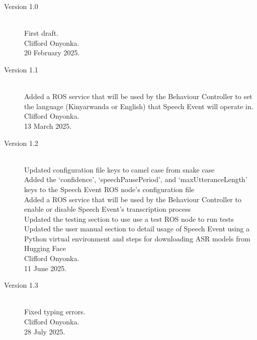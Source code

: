 \documentclass{CSSRforAfrica}
\begin{document}
\begin{description}

\item [Version 1.0]~\\
First draft. \\
Clifford Onyonka. \\                                     %
20 February 2025.                                                        %

\item [Version 1.1]~\\
Added a ROS service that will be used by the Behaviour Controller to set the language (Kinyarwanda or English) that Speech Event will operate in. \\
Clifford Onyonka. \\
13 March 2025.

\item [Version 1.2]~\\
Updated configuration file keys to camel case from snake case \\
Added the `confidence', `speechPausePeriod', and `maxUtteranceLength' keys to the Speech Event ROS node's configuration file \\
Added a ROS service that will be used by the Behaviour Controller to enable or disable Speech Event's transcription process \\
Updated the testing section to use use a test ROS node to run tests \\
Updated the user manual section to detail usage of Speech Event using a Python virtual environment and steps for downloading ASR models from Hugging Face \\
Clifford Onyonka. \\
11 June 2025.

\item [Version 1.3]~\\
Fixed typing errors.\\
Clifford Onyonka. \\
28 July 2025.



\end{description}
\end{document}

